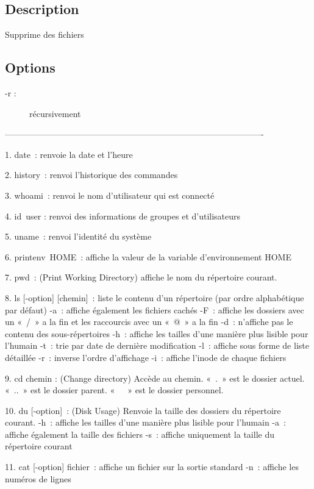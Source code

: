 \documentclass[a4paper, 10pt, onecolumn, openright, oneside]{book}
\begin{document}
\subsection{Description}
Supprime des fichiers
\subsection{Options}
\begin{description}
\item[-r :] récursivement
\end{description}



-------------------------------------------------------------------------------------------



    1. date : renvoie la date et l’heure

    2. history : renvoi l'historique des commandes

    3. whoami : renvoi le nom d'utilisateur qui est connecté

    4. id user : renvoi des informations de groupes et d’utilisateurs

    5. uname : renvoi l’identité du système

    6. printenv HOME :  affiche la valeur de la variable d'environnement HOME

    7. pwd : (Print Working Directory) affiche le nom du répertoire courant. 

    8. ls [-option] [chemin] : liste le contenu d'un répertoire (par ordre alphabétique par défaut)
-a : affiche également les fichiers cachés
-F : affiche les dossiers avec un « / » a la fin et les raccourcis avec un « @ » a la fin
-d : n'affiche pas le contenu des sous-répertoires
-h : affiche les tailles d’une manière plus lisible pour l’humain
-t : trie par date de dernière modification
-l : affiche sous forme de liste détaillée
-r : inverse l'ordre d'affichage
-i : affiche l’inode de chaque fichiers

    9. cd chemin : (Change directory) Accède au chemin. « . » est le dossier actuel. « .. » est le dossier parent. « ~ » est le dossier personnel.

    10. du  [-option] : (Disk Usage) Renvoie la taille des dossiers du répertoire courant.
-h : affiche les tailles d’une manière plus lisible pour l’humain
-a : affiche également la taille des fichiers
-s : affiche uniquement la taille du répertoire courant

    11. cat [-option] fichier : affiche un fichier sur la sortie standard
-n : affiche les numéros de lignes
\end{document}
